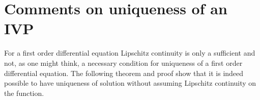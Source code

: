









\section{Comments on uniqueness of an IVP}

	For a first order differential equation Lipschitz continuity is only a
	sufficient and not, as one might think, a necessary condition for
	uniqueness of a first order differential equation. The following theorem
	and proof show that it is indeed possible to have uniqueness of solution
	without assuming Lipschitz continuity on the function.

